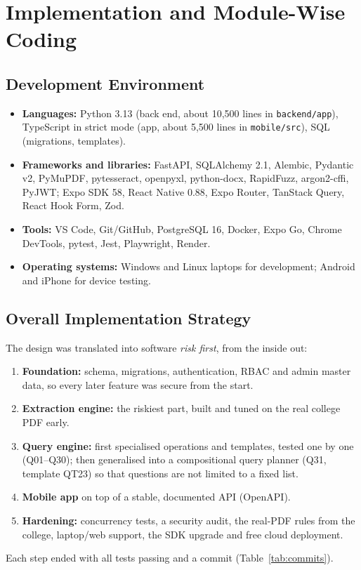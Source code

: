 \section{Implementation and Module-Wise Coding}

\subsection{Development Environment}
\begin{itemize}
\item \textbf{Languages:} Python 3.13 (back end, about 10{,}500 lines in \texttt{backend/app}), TypeScript
      in strict mode (app, about 5{,}500 lines in \texttt{mobile/src}), SQL (migrations, templates).
\item \textbf{Frameworks and libraries:} FastAPI, SQLAlchemy 2.1, Alembic, Pydantic v2, PyMuPDF,
      pytesseract, openpyxl, python-docx, RapidFuzz, argon2-cffi, PyJWT; Expo SDK 58, React Native 0.88,
      Expo Router, TanStack Query, React Hook Form, Zod.
\item \textbf{Tools:} VS Code, Git/GitHub, PostgreSQL 16, Docker, Expo Go, Chrome DevTools, pytest,
      Jest, Playwright, Render.
\item \textbf{Operating systems:} Windows and Linux laptops for development; Android and iPhone for device testing.
\end{itemize}

\subsection{Overall Implementation Strategy}
The design was translated into software \emph{risk first}, from the inside out:
\begin{enumerate}
\item \textbf{Foundation:} schema, migrations, authentication, RBAC and admin master data, so every
      later feature was secure from the start.
\item \textbf{Extraction engine:} the riskiest part, built and tuned on the real college PDF early.
\item \textbf{Query engine:} first specialised operations and templates, tested one by one (Q01--Q30);
      then generalised into a compositional query planner (Q31, template QT23) so that questions are not
      limited to a fixed list.
\item \textbf{Mobile app} on top of a stable, documented API (OpenAPI).
\item \textbf{Hardening:} concurrency tests, a security audit, the real-PDF rules from the college,
      laptop/web support, the SDK upgrade and free cloud deployment.
\end{enumerate}
Each step ended with all tests passing and a commit (Table~\ref{tab:commits}).


